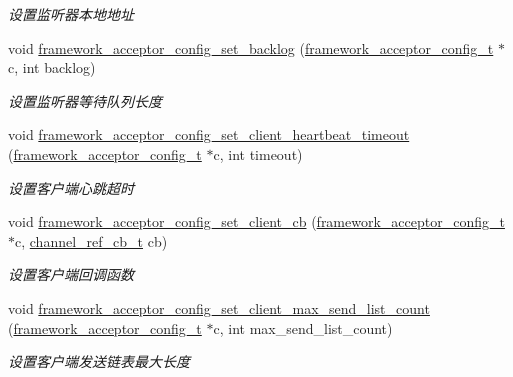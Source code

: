 \begin{DoxyCompactItemize}
\begin{DoxyCompactList}\small\item\em 设置监听器本地地址 \end{DoxyCompactList}\item 
void \hyperlink{a00103_gae96d14bcf7b70e8ad52fe614ad848c2c_gae96d14bcf7b70e8ad52fe614ad848c2c}{framework\+\_\+acceptor\+\_\+config\+\_\+set\+\_\+backlog} (\hyperlink{a00050_a61a4e424ff4c86631423dedd97c40064_a61a4e424ff4c86631423dedd97c40064}{framework\+\_\+acceptor\+\_\+config\+\_\+t} $\ast$c, int backlog)
\begin{DoxyCompactList}\small\item\em 设置监听器等待队列长度 \end{DoxyCompactList}\item 
void \hyperlink{a00103_gab810538b3fa23ae98027e451f52e4221_gab810538b3fa23ae98027e451f52e4221}{framework\+\_\+acceptor\+\_\+config\+\_\+set\+\_\+client\+\_\+heartbeat\+\_\+timeout} (\hyperlink{a00050_a61a4e424ff4c86631423dedd97c40064_a61a4e424ff4c86631423dedd97c40064}{framework\+\_\+acceptor\+\_\+config\+\_\+t} $\ast$c, int timeout)
\begin{DoxyCompactList}\small\item\em 设置客户端心跳超时 \end{DoxyCompactList}\item 
void \hyperlink{a00103_ga93ecf8240201cbc64b76857242fb39d6_ga93ecf8240201cbc64b76857242fb39d6}{framework\+\_\+acceptor\+\_\+config\+\_\+set\+\_\+client\+\_\+cb} (\hyperlink{a00050_a61a4e424ff4c86631423dedd97c40064_a61a4e424ff4c86631423dedd97c40064}{framework\+\_\+acceptor\+\_\+config\+\_\+t} $\ast$c, \hyperlink{a00050_ae296ec4d1ce108960de8dcc423956a1d_ae296ec4d1ce108960de8dcc423956a1d}{channel\+\_\+ref\+\_\+cb\+\_\+t} cb)
\begin{DoxyCompactList}\small\item\em 设置客户端回调函数 \end{DoxyCompactList}\item 
void \hyperlink{a00103_ga7c7289f2fdf2a2e220ceec22b5532909_ga7c7289f2fdf2a2e220ceec22b5532909}{framework\+\_\+acceptor\+\_\+config\+\_\+set\+\_\+client\+\_\+max\+\_\+send\+\_\+list\+\_\+count} (\hyperlink{a00050_a61a4e424ff4c86631423dedd97c40064_a61a4e424ff4c86631423dedd97c40064}{framework\+\_\+acceptor\+\_\+config\+\_\+t} $\ast$c, int max\+\_\+send\+\_\+list\+\_\+count)
\begin{DoxyCompactList}\small\item\em 设置客户端发送链表最大长度 \end{DoxyCompactList}\item 

\end{DoxyCompactItemize}
